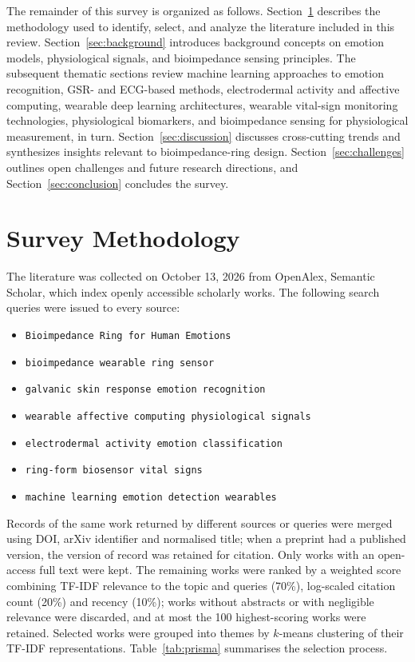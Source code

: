 The remainder of this survey is organized as follows. Section~\ref{sec:method} describes the methodology used to identify, select, and analyze the literature included in this review. Section~\ref{sec:background} introduces background concepts on emotion models, physiological signals, and bioimpedance sensing principles. The subsequent thematic sections review machine learning approaches to emotion recognition, GSR- and ECG-based methods, electrodermal activity and affective computing, wearable deep learning architectures, wearable vital-sign monitoring technologies, physiological biomarkers, and bioimpedance sensing for physiological measurement, in turn. Section~\ref{sec:discussion} discusses cross-cutting trends and synthesizes insights relevant to bioimpedance-ring design. Section~\ref{sec:challenges} outlines open challenges and future research directions, and Section~\ref{sec:conclusion} concludes the survey.

\section{Survey Methodology}\label{sec:method}
The literature was collected on October 13, 2026 from OpenAlex, Semantic Scholar, which index openly accessible scholarly works. The following search queries were issued to every source:
\begin{itemize}
\item \texttt{Bioimpedance Ring for Human Emotions}
\item \texttt{bioimpedance wearable ring sensor}
\item \texttt{galvanic skin response emotion recognition}
\item \texttt{wearable affective computing physiological signals}
\item \texttt{electrodermal activity emotion classification}
\item \texttt{ring-form biosensor vital signs}
\item \texttt{machine learning emotion detection wearables}
\end{itemize}

Records of the same work returned by different sources or queries were merged using DOI, arXiv identifier and normalised title; when a preprint had a published version, the version of record was retained for citation. Only works with an open-access full text were kept. The remaining works were ranked by a weighted score combining TF-IDF relevance to the topic and queries (70\%), log-scaled citation count (20\%) and recency (10\%); works without abstracts or with negligible relevance were discarded, and at most the 100 highest-scoring works were retained. Selected works were grouped into themes by $k$-means clustering of their TF-IDF representations. Table~\ref{tab:prisma} summarises the selection process.

